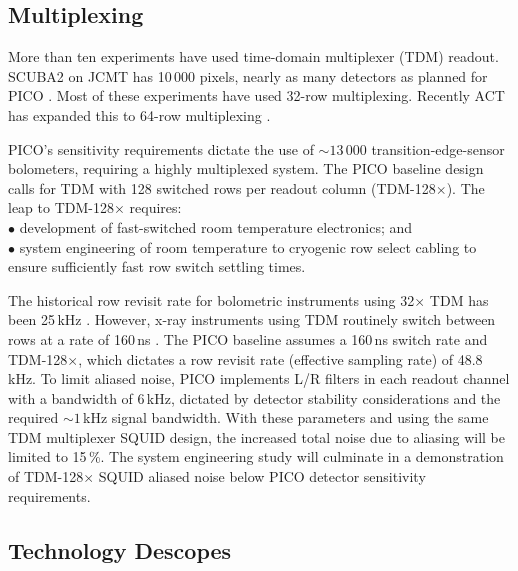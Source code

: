 \subsection{Multiplexing}
\label{sec:multiplexing}

More than ten experiments have used time-domain multiplexer (TDM)
readout. SCUBA2 on JCMT has 10\,000 pixels, nearly as many detectors
as planned for PICO \citep{Holland2013}. Most of these experiments
have used 32-row multiplexing. Recently ACT has expanded this to
64-row multiplexing \citep{Henderson2016}.

PICO's sensitivity requirements dictate the use of $\sim 13\,000$
transition-edge-sensor bolometers, requiring a highly multiplexed
system.  The PICO baseline design calls for TDM
with 128 switched rows per readout column (TDM-128$\times$). The leap
to TDM-128$\times$ requires: \\
$\bullet$ development of fast-switched room temperature electronics; and \\
$\bullet$ system engineering of room temperature to cryogenic row select cabling to ensure sufficiently fast row switch settling times.

The historical row revisit rate for bolometric instruments using
32$\times$ TDM has been 25\,kHz \cite[e.g.,][]{BICEP2015}. However,
x-ray instruments using TDM routinely switch between rows at a rate of
160\,ns \citep{Doriese2016}. The PICO baseline assumes a 160\,ns
switch rate and TDM-128$\times$, which dictates a row revisit rate
(effective sampling rate) of 48.8\,kHz. To limit aliased noise, PICO
implements L/R filters in each readout channel with a bandwidth of
6\,kHz, dictated by detector stability considerations and the required
$\sim1$\,kHz signal bandwidth.  With these parameters and using the
same TDM multiplexer SQUID design, the increased total noise due to
aliasing will be limited to 15\,\%.  The system engineering study will
culminate in a demonstration of TDM-128$\times$ SQUID aliased noise
below PICO detector sensitivity requirements.


\subsection{Technology Descopes}
\label{sec:technology_descopes} %

